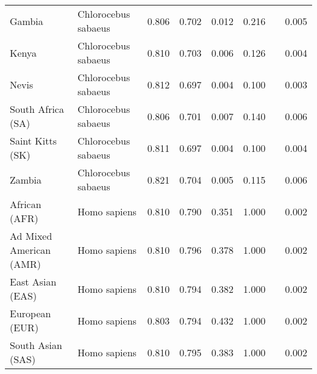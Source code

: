 \begin{center}
\begin{adjustbox}{width = 1\textwidth}
\begin{tabular}{|l|l|r|r|r|r|r|}
                         Gambia &  Chlorocebus sabaeus &                                              0.806 &                                              0.702 &            0.012 &                         0.216~~ &              0.005 \\
                          Kenya &  Chlorocebus sabaeus &                                              0.810 &                                              0.703 &            0.006 &                         0.126~~ &              0.004 \\
                          Nevis &  Chlorocebus sabaeus &                                              0.812 &                                              0.697 &            0.004 &                         0.100~~ &              0.003 \\
              South Africa (SA) &  Chlorocebus sabaeus &                                              0.806 &                                              0.701 &            0.007 &                         0.140~~ &              0.006 \\
               Saint Kitts (SK) &  Chlorocebus sabaeus &                                              0.811 &                                              0.697 &            0.004 &                         0.100~~ &              0.004 \\
                         Zambia &  Chlorocebus sabaeus &                                              0.821 &                                              0.704 &            0.005 &                         0.115~~ &              0.006 \\
                  African (AFR) &         Homo sapiens &                                              0.810 &                                              0.790 &            0.351 &                         1.000~~ &              0.002 \\
        Ad Mixed American (AMR) &         Homo sapiens &                                              0.810 &                                              0.796 &            0.378 &                         1.000~~ &              0.002 \\
               East Asian (EAS) &         Homo sapiens &                                              0.810 &                                              0.794 &            0.382 &                         1.000~~ &              0.002 \\
                 European (EUR) &         Homo sapiens &                                              0.803 &                                              0.794 &            0.432 &                         1.000~~ &              0.002 \\
              South Asian (SAS) &         Homo sapiens &                                              0.810 &                                              0.795 &            0.383 &                         1.000~~ &              0.002 \\
\bottomrule
\end{tabular}
\end{adjustbox}
\newpage
\end{center}
